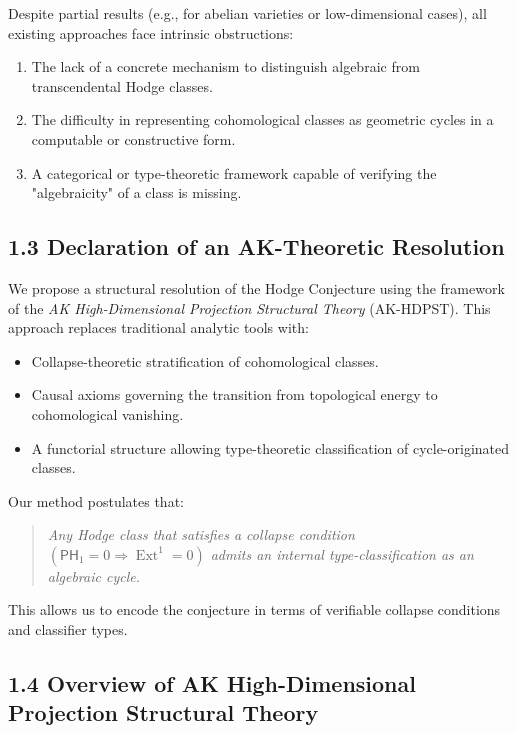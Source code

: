 \documentclass[11pt]{article}
\DeclareMathOperator{\Ext}{Ext}
\begin{document}
Despite partial results (e.g., for abelian varieties or low-dimensional cases), all existing approaches face intrinsic obstructions:
\begin{enumerate}
  \item The lack of a concrete mechanism to distinguish algebraic from transcendental Hodge classes.
  \item The difficulty in representing cohomological classes as geometric cycles in a computable or constructive form.
  \item A categorical or type-theoretic framework capable of verifying the "algebraicity" of a class is missing.
\end{enumerate}

\subsection{1.3 Declaration of an AK-Theoretic Resolution}

We propose a structural resolution of the Hodge Conjecture using the framework of the \emph{AK High-Dimensional Projection Structural Theory} (AK-HDPST).  
This approach replaces traditional analytic tools with:

\begin{itemize}
  \item Collapse-theoretic stratification of cohomological classes.
  \item Causal axioms governing the transition from topological energy to cohomological vanishing.
  \item A functorial structure allowing type-theoretic classification of cycle-originated classes.
\end{itemize}

Our method postulates that:

\begin{quote}
\emph{Any Hodge class that satisfies a collapse condition $(\mathsf{PH}_1 = 0 \Rightarrow \Ext^1 = 0)$  
admits an internal type-classification as an algebraic cycle.}
\end{quote}

This allows us to encode the conjecture in terms of verifiable collapse conditions and classifier types.

\subsection{1.4 Overview of AK High-Dimensional Projection Structural Theory}
\end{document}
